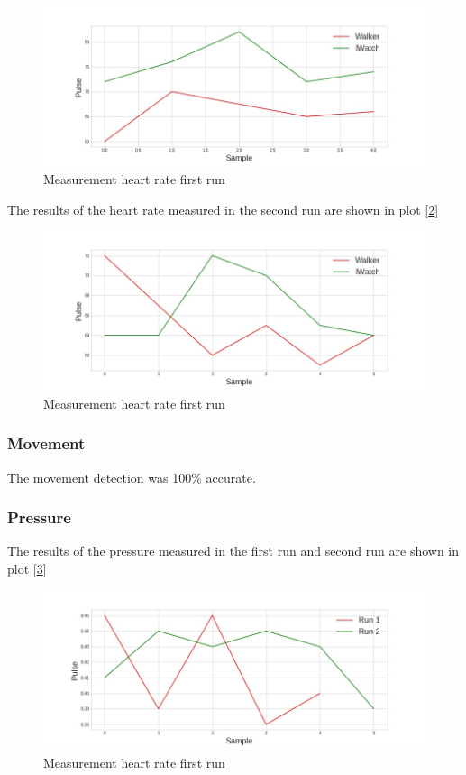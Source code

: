 			\begin{figure}[h!]
				\centering
				\includegraphics[width=1.1\linewidth]{gfx/pulse_run1_diff.jpg}
				\caption{Measurement heart rate first run}
				\label{fig:HeartRateFirst}
			\end{figure}
			\newpage
			The results of the heart rate measured in the second run are shown in plot [\ref{fig:HeartRateSecond}]

			\begin{figure}[h!]
				\centering
				\includegraphics[width=1.1\linewidth]{gfx/pulse_run2_diff.jpg}
				\caption{Measurement heart rate first run}
				\label{fig:HeartRateSecond}
			\end{figure}

		\subsubsection{Movement}
			The movement detection was 100\% accurate.

		\subsubsection{Pressure}
			The results of the pressure measured in the first run and second run are shown in plot [\ref{fig:PressureDiff}]
			
			\begin{figure}[h!]
				\centering
				\includegraphics[width=1.1\linewidth]{gfx/pressure_diff.jpg}
				\caption{Measurement heart rate first run}
				\label{fig:PressureDiff}
			\end{figure}
		\newpage
